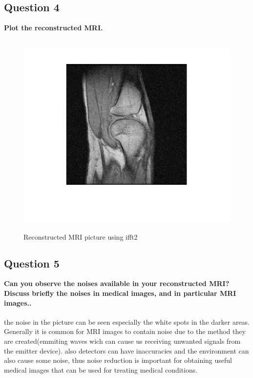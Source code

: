 \documentclass[11pt]{article}
\begin{document}
\subsection{Question 4}
\textbf{Plot the reconstructed MRI.} \\
\vspace{0.2cm} \\
\begin{figure}[H]
    \begin{center}
        \includegraphics[scale=0.8]{Fig/ifft2.knee.png}
        \label{fig:noisyImage}
        \caption{Reconstructed MRI picture using ifft2}
    \end{center}
\end{figure}


\subsection{Question 5}
\textbf{Can you observe the noises available in your reconstructed MRI? Discuss briefly the noises
in medical images, and in particular MRI images..} \\
\vspace{0.1cm} \\

the noise in the picture can be seen especially the white spots in the darker areas. \\
Generally it is common for MRI images to contain noise due to the method they are
created(emmiting waves wich can cause us receiving unwanted signals from the emitter device).
also detectors can have inaccuracies and the environment can also cause some noise,
thus noise reduction is important for obtaining useful medical images that can be used
for treating medical conditions.
\end{document}

